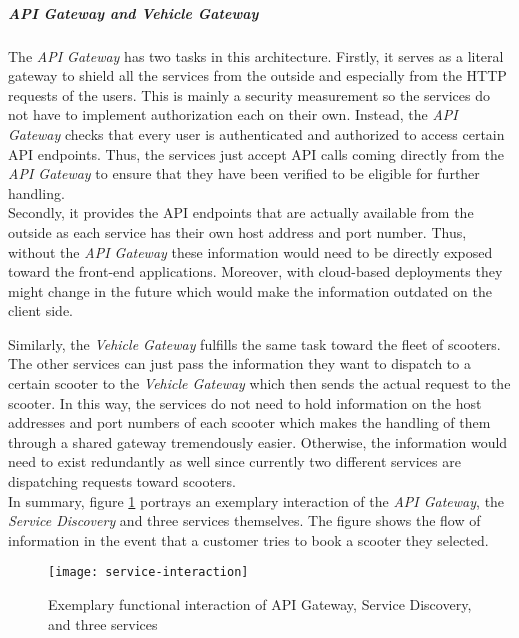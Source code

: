 \documentclass[12pt,a4paper,twoside]{report}
\begin{document}
\subparagraph{API Gateway and Vehicle Gateway}
The \textit{API Gateway} has two tasks in this architecture.
Firstly, it serves as a literal gateway to shield all the services from
the outside and especially from the HTTP requests of the users.
This is mainly a security measurement so the services do not have to
implement authorization each on their own. Instead, the \textit{API Gateway}
checks that every user is authenticated and authorized to access certain
API endpoints. Thus, the services just accept API calls coming directly from
the \textit{API Gateway} to ensure that they have been verified to be eligible
for further handling.\\
Secondly, it provides the API endpoints that are actually available from the
outside as each service has their own host address and port number.
Thus, without the \textit{API Gateway} these information would need to be
directly exposed toward the front-end applications. Moreover, with cloud-based
deployments they might change in the future which would make the information
outdated on the client side.

Similarly, the \textit{Vehicle Gateway} fulfills the same task toward the
fleet of scooters. The other services can just pass the
information they want to dispatch to a certain scooter to the
\textit{Vehicle Gateway} which then sends the actual request to the scooter.
In this way, the services do not need to hold information on the host addresses
and port numbers of each scooter which makes the handling of them through
a shared gateway tremendously easier. Otherwise, the information would need
to exist redundantly as well since currently two different services are
dispatching requests toward scooters.\\

In summary, figure \ref{fig:service-interaction} portrays an exemplary interaction of the
\textit{API Gateway}, the \textit{Service Discovery} and three services themselves.
The figure shows the flow of information in the event that a customer tries to
book a scooter they selected.

\begin{figure}[htb]
\centering
\texttt{[image: service-interaction]}
\caption{Exemplary functional interaction of API Gateway, Service Discovery, and three services}
\label{fig:service-interaction}
\end{figure}
\end{document}
